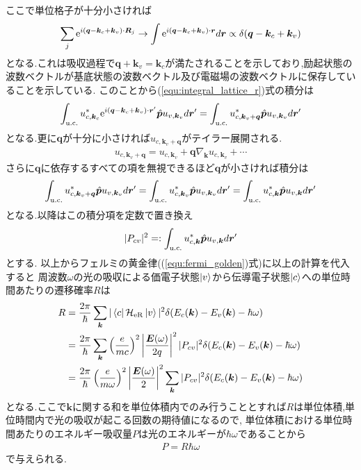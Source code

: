 \documentclass[uplatex,a4j,11pt,dvipdfmx]{jsarticle}
\begin{document}
ここで単位格子が十分小さければ
\begin{align}
  \sum_j{\rm e}^{i({\bm q}-{\bm k}_c+{\bm k}_v)\cdot{\bm R}_j}\rightarrow\int{\rm e}^{i({\bm q}-{\bm k}_c+{\bm k}_v)\cdot{\bm r}}d{\bm r}\propto\delta({\bm q}-{\bm k}_c+{\bm k}_v)
\end{align}
となる.これは吸収過程で${\bm q}+{\bm k}_v={\bm k}_c$が満たされることを示しており,励起状態の波数ベクトルが基底状態の波数ベクトル及び電磁場の波数ベクトルに保存していることを示している.
このことから(\ref{equ:integral_lattice_r})式の積分は
\begin{align}
  \int_{\rm u.c.} u_{c,{\bm k}_c}^*{\rm e}^{i({\bm q}-{\bm k}_c+{\bm k}_v)\cdot{\bm r}'}\hat{\bm p}u_{v,{\bm k}_v}d{\bm r}'
  =\int_{\rm u.c.} u_{c,{\bm k}_v+{\bm q}}^*\hat{\bm p}u_{v,{\bm k}_v}d{\bm r}'
\end{align}
となる.更に$\bm q$が十分に小さければ$u_{c,{\bm k}_v+{\bm q}}$がテイラー展開される.
\begin{align}
  u_{c,{\bm k}_v+{\bm q}}=u_{c,{\bm k}_v}+{\bm q}\nabla_{\bm k}u_{c,{\bm k }_v}+\cdots
\end{align}
さらに$\bm q$に依存するすべての項を無視できるほど$\bm q$が小さければ積分は
\begin{align}
  \begin{split}
    \int_{\rm u.c.}u_{c,{\bm k}_v+{\bm q}}^*\hat{\bm p}u_{v,{\bm k}_v}d{\bm r}'
    =\int_{\rm u.c.}u_{c,{\bm k}_v}^*\hat{\bm p}u_{v,{\bm k}_v}d{\bm r}'
    =\int_{\rm u.c.}u_{c,{\bm k}}^*\hat{\bm p}u_{v,{\bm k}}d{\bm r}'
  \end{split}
\end{align}
となる.以降はこの積分項を定数で置き換え
\begin{align}
  |P_{cv}|^2=:\int_{\rm u.c.}u_{c,{\bm k}}^*\hat{\bm p}u_{v,{\bm k}}d{\bm r}'
\end{align}
とする.
以上からフェルミの黄金律((\ref{equ:fermi_golden})式)に以上の計算を代入すると
周波数$\omega$の光の吸収による価電子状態$\ket{v}$から伝導電子状態$\ket{c}$への単位時間あたりの遷移確率$R$は
\begin{align}
  \begin{split}
    R&=\frac{2\pi}{\hbar}\sum_{\bm k}|\bra{c}\mathcal{H}_{\rm eR}\ket{v}|^2\delta(E_c({\bm k})-E_v({\bm k})-\hbar\omega)\\
    &=\frac{2\pi}{\hbar}\sum_{\bm k}\left(\frac{e}{mc}\right)^2\left|\frac{{\bm E}(\omega)}{2q}\right|^2|P_{cv}|^2\delta(E_c({\bm k})-E_v({\bm k})-\hbar\omega)\\
    &=\frac{2\pi}{\hbar}\left(\frac{e}{m\omega}\right)^2\left|\frac{{\bm E}(\omega)}{2}\right|^2\sum_{\bm k}|P_{cv}|^2\delta(E_c({\bm k})-E_v({\bm k})-\hbar\omega)
  \end{split}
\end{align}
となる.ここで$\bm k$に関する和を単位体積内でのみ行うこととすれば$R$は単位体積,単位時間内で光の吸収が起こる回数の期待値になるので,
単位体積における単位時間あたりのエネルギー吸収量$P$は光のエネルギーが$\hbar\omega$であることから
\begin{align}
  \label{equ:P=Rho}
  P=R\hbar\omega
\end{align}
で与えられる.
\end{document}

